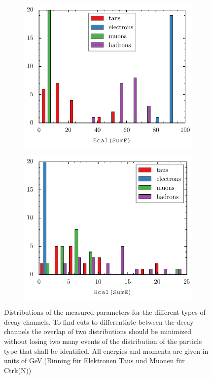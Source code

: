 \documentclass[11pt, a4paper]{article}
\numberwithin{equation}{section}
\newcommand{\korr}[1]{{\color{red}(#1)}}
\begin{document}
\begin{figure}[htb]
\begin{subfigure}{.5\textwidth}
	\end{subfigure}
	\begin{subfigure}{.5\textwidth}
		\centering
		\includegraphics[width=\textwidth]{./figures/event_display/Ecal(SumE)}

	\end{subfigure}
	\begin{subfigure}{.5\textwidth}
		\centering
		\includegraphics[width=\textwidth]{./figures/event_display/Hcal(SumE)}

	\end{subfigure}
	\caption{Distributions of the measured parameters for the different types of decay channels. To find cuts to differentiate between the decay channels the overlap of two distributions should be minimized without losing two many events of the distribution of the particle type that shall be identified. All energies and momenta are given in units of \si{GeV}.\korr{Binning für Elektronen Taus und Muonen für Ctrk(N)}}
	\label{fig:histograms}
\end{figure}
\end{document}
